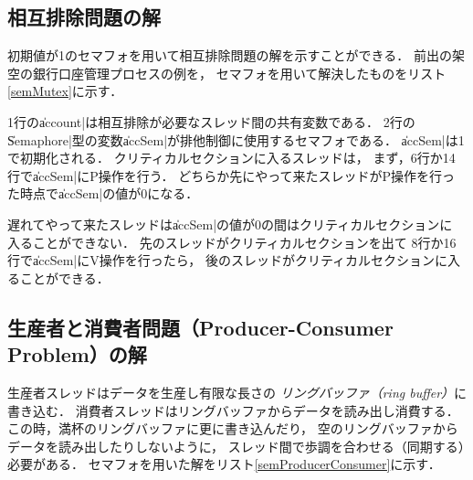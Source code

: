 \subsection{相互排除問題の解}
初期値が1のセマフォを用いて相互排除問題の解を示すことができる．
前出の架空の銀行口座管理プロセスの例を，
セマフォを用いて解決したものをリスト\ref{semMutex}に示す．



1行の\|account|は相互排除が必要なスレッド間の共有変数である．
2行の\|Semaphore|型の変数\|accSem|が排他制御に使用するセマフォである．
\|accSem|は1で初期化される．
クリティカルセクションに入るスレッドは，
まず，6行か14行で\|accSem|にP操作を行う．
どちらか先にやって来たスレッドがP操作を行った時点で\|accSem|の値が0になる．

遅れてやって来たスレッドは\|accSem|の値が0の間はクリティカルセクションに
入ることができない．
先のスレッドがクリティカルセクションを出て
8行か16行で\|accSem|にV操作を行ったら，
後のスレッドがクリティカルセクションに入ることができる．

\subsection{生産者と消費者問題（Producer-Consumer Problem）の解}
生産者スレッドはデータを生産し有限な長さの
\emph{リングバッファ（ring buffer）}に書き込む．
消費者スレッドはリングバッファからデータを読み出し消費する．
この時，満杯のリングバッファに更に書き込んだり，
空のリングバッファからデータを読み出したりしないように，
スレッド間で歩調を合わせる（同期する）必要がある．
セマフォを用いた解をリスト\ref{semProducerConsumer}に示す．



